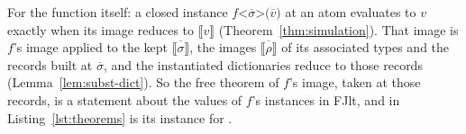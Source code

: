 For the function itself: a closed instance $f\texttt{<}\overline{\sigma}\texttt{>(}\overline{v}\texttt{)}$ at an atom evaluates to $v$ exactly when its image reduces to $\llbracket v \rrbracket$ (Theorem~\ref{thm:simulation}).
That image is $f$'s image applied to the kept $\overline{\llbracket \sigma \rrbracket}$, the images $\overline{\llbracket \rho \rrbracket}$ of its associated types and the records built at $\overline{\sigma}$, and the instantiated dictionaries reduce to those records (Lemma~\ref{lem:subst-dict}).
So the free theorem of $f$'s image, taken at those records, is a statement about the values of $f$'s instances in FJlt, and  in Listing~\ref{lst:theorems} is its instance for .

